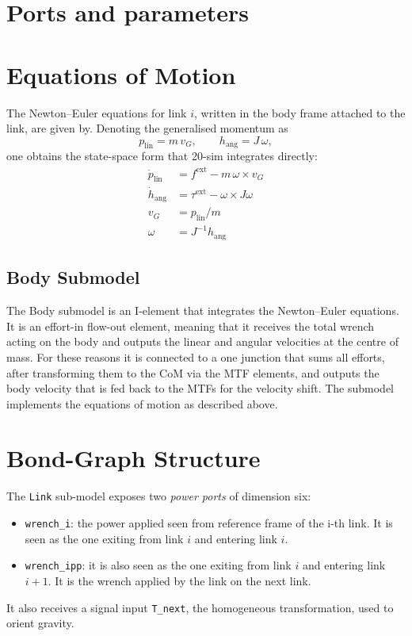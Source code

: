 \section{Ports and parameters}

\section{Equations of Motion}

The Newton--Euler equations for link $i$, written in the body frame attached to the link, are given by.
Denoting the generalised momentum as
\begin{equation}
  p_{\text{lin}} = m\,v_G, \qquad h_{\text{ang}} = J\,\omega,
\end{equation}
one obtains the state-space form that 20-sim integrates directly:
\begin{align}
  \dot{p}_{\text{lin}} &= f^{\text{ext}} - m\,\omega \times v_G \\
  \dot{h}_{\text{ang}} &= \tau^{\text{ext}} - \omega \times J\omega \\
  v_G &= p_{\text{lin}} / m \\
  \omega &= J^{-1} h_{\text{ang}}
\end{align}

\subsection{Body Submodel}
The Body submodel is an I-element that integrates the Newton--Euler equations. It is an effort-in flow-out element, meaning that it receives the total wrench acting on the body and outputs the linear and angular velocities at the centre of mass.
For these reasons it is connected to a one junction that sums all efforts, after transforming them to the CoM via the MTF elements, and outputs the body velocity that is fed back to the MTFs for the velocity shift.
The submodel implements the equations of motion as described above.

\section{Bond-Graph Structure}

The \texttt{Link} sub-model exposes two \emph{power ports} of dimension six:
\begin{itemize}
  \item \texttt{wrench\_i}: the power applied seen from reference frame of the i-th link. It is seen as the one exiting from link $i$ and entering link $i$.
  \item \texttt{wrench\_ipp}: it is also seen as the one exiting from link $i$ and entering link $i+1$. It is the wrench applied by the link on the next link.
\end{itemize}
It also receives a signal input \texttt{T\_next}, the homogeneous transformation, used to orient gravity.

